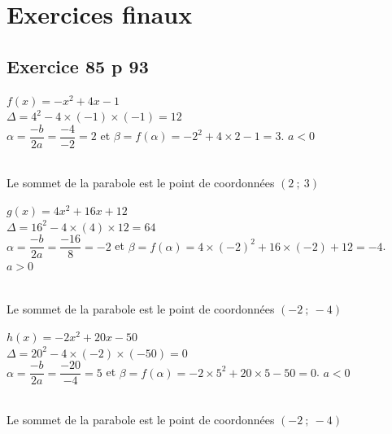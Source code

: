 \documentclass[12pt,a4paper]{book}
\begin{document}
\section*{Exercices finaux}
    
\subsection*{Exercice 85 p 93}

\begin{enumMet}
    \item $f(x)=-x^{2}+4 x-1$\\
    $\Delta=4^2-4\times(-1)\times(-1)=12$\\
    $\alpha=\dfrac{-b}{2a}=\dfrac{-4}{-2}=2$ et $\beta=f(\alpha)=-2^2+4\times2-1=3$. $a<0$\\
    \\
    Le sommet de la parabole est le point de coordonnées $\left(2\ ;\ 3\right)$
    \item $g(x)=4 x^{2}+16 x+12$\\
    $\Delta=16^2-4\times(4)\times12=64$\\
    $\alpha=\dfrac{-b}{2a}=\dfrac{-16}{8}=-2$ et $\beta=f(\alpha)=4\times(-2)^2+16\times(-2)+12=-4$. $a>0$\\
    \\
    Le sommet de la parabole est le point de coordonnées $\left(-2\ ;\ -4\right)$
    \item $h(x)=-2 x^{2}+20 x-50$\\
    $\Delta=20^2-4\times(-2)\times(-50)=0$\\
    $\alpha=\dfrac{-b}{2a}=\dfrac{-20}{-4}=5$ et $\beta=f(\alpha)=-2\times5^2+20\times5-50=0$. $a<0$\\
    \\
    Le sommet de la parabole est le point de coordonnées $\left(-2\ ;\ -4\right)$

\end{enumMet}
\end{document}
